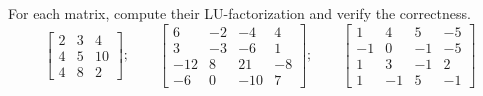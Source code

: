 \begin{exercise}\label{ex:2.6}
    For each matrix, compute their LU-factorization and verify the correctness.
    \[
        \begin{bmatrix}
            2 & 3 & 4 \\
            4 & 5 & 10 \\
            4 & 8 & 2
        \end{bmatrix};
        \qquad
        \begin{bmatrix}
            6 & -2 & -4 & 4\\
            3 & -3 & -6 & 1 \\
            -12 & 8 & 21 & -8 \\
            -6 & 0 & -10 & 7
        \end{bmatrix};
        \qquad
        \begin{bmatrix}
            1 & 4 & 5 & -5 \\
            -1 & 0 & -1 & -5 \\
            1 & 3 & -1 & 2 \\
            1 & -1 & 5 & -1 
        \end{bmatrix}
    \]
\end{exercise}

